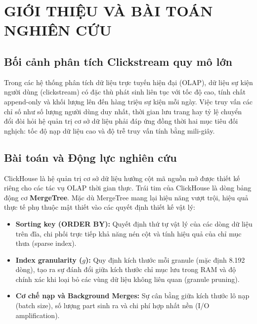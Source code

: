 \section{GIỚI THIỆU VÀ BÀI TOÁN NGHIÊN CỨU}
\label{sec:gioi_thieu}


\subsection{Bối cảnh phân tích Clickstream quy mô lớn}
Trong các hệ thống phân tích dữ liệu trực tuyến hiện đại (OLAP), dữ liệu sự kiện người dùng (clickstream) có đặc thù phát sinh liên tục với tốc độ cao, tính chất append-only và khối lượng lên đến hàng triệu sự kiện mỗi ngày. Việc truy vấn các chỉ số như số lượng người dùng duy nhất, thời gian lưu trang hay tỷ lệ chuyển đổi đòi hỏi hệ quản trị cơ sở dữ liệu phải đáp ứng đồng thời hai mục tiêu đối nghịch: tốc độ nạp dữ liệu cao và độ trễ truy vấn tính bằng mili-giây.

\subsection{Bài toán và Động lực nghiên cứu}
ClickHouse là hệ quản trị cơ sở dữ liệu hướng cột mã nguồn mở được thiết kế riêng cho các tác vụ OLAP thời gian thực. Trái tim của ClickHouse là dòng bảng động cơ \textbf{MergeTree}. Mặc dù MergeTree mang lại hiệu năng vượt trội, hiệu quả thực tế phụ thuộc mật thiết vào các quyết định thiết kế vật lý:
\begin{itemize}
    \item \textbf{Sorting key (ORDER BY):} Quyết định thứ tự vật lý của các dòng dữ liệu trên đĩa, chi phối trực tiếp khả năng nén cột và tính hiệu quả của chỉ mục thưa (sparse index).
    \item \textbf{Index granularity ($g$):} Quy định kích thước mỗi granule (mặc định 8.192 dòng), tạo ra sự đánh đổi giữa kích thước chỉ mục lưu trong RAM và độ chính xác khi loại bỏ các vùng dữ liệu không liên quan (granule pruning).
    \item \textbf{Cơ chế nạp và Background Merges:} Sự cân bằng giữa kích thước lô nạp (batch size), số lượng part sinh ra và chi phí hợp nhất nền (I/O amplification).
\end{itemize}

